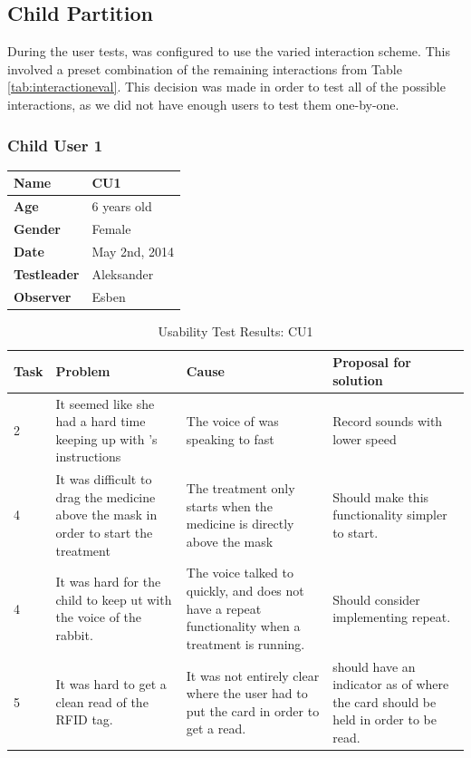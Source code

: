 \subsection{Child Partition}

During the user tests, \ab{} was configured to use the varied interaction scheme. This involved a preset combination of the remaining interactions from Table \ref{tab:interactioneval}. This decision was made in order to test all of the possible interactions, as we did not have enough users to test them one-by-one. 

\subsubsection{Child User 1}
\begin{table}[H]
\centering
\begin{tabular}{| p{4.0cm} | p{4.0cm} |}
\hline
 \textbf{Name} & CU1 \\
 \hline
 \textbf{Age} & 6 years old \\
 \hline 
 \textbf{Gender} & Female \\
 \hline 
 \textbf{Date} & May 2nd, 2014 \\
 \hline
 \textbf{Testleader} & Aleksander \\
 \hline
 \textbf{Observer} & Esben \\
 \hline
\end{tabular}
\end{table}

\begin{table}[H]
\centering
\begin{tabular}{| p{1.0cm} | p{4.0cm} | p{4.0cm} | p{4.0cm} |}
\hline
	\textbf{Task} & \textbf{Problem} & \textbf{Cause} & \textbf{Proposal for solution} \\
	\hline
	2 & It seemed like she had a hard time keeping up with \ab{}'s instructions & The voice of \ab{} was speaking to fast & Record sounds with lower speed \\
	\hline
	4 & It was difficult to drag the medicine above the mask in order to start the treatment & The treatment only starts when the medicine is directly above the mask & Should make this functionality simpler to start.  \\
	\hline
	4 & It was hard for the child to keep ut with the voice of the rabbit. & The voice talked to quickly, and \app{} does not have a repeat functionality when a treatment is running. & Should consider implementing repeat.\\ 
	\hline
	5 & It was hard to get a clean read of the RFID tag. & It was not entirely clear where the user had to put the card in order to get a read. & \ab{} should have an indicator as of where the card should be held in order to be read.  \\
	\hline
\end{tabular}
\caption{Usability Test Results: CU1}
\label{tab:testchild1}
\end{table}

